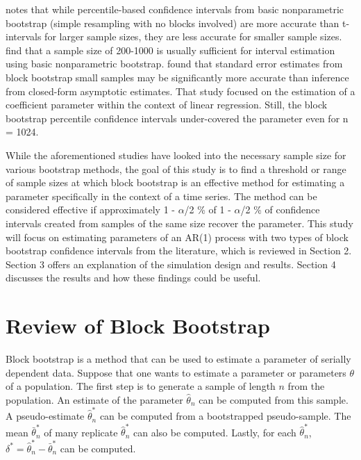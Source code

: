 \documentclass[12pt, letterpaper, titlepage]{article}
\begin{document}
\citet{hesterberg2015teachers} notes that while percentile-based confidence intervals from basic nonparametric bootstrap 
(simple resampling with no blocks involved) are more accurate than t-intervals for larger sample sizes, 
they are less accurate for smaller sample sizes. \citet{nevitt2001performance} find that a sample size of 
200-1000 is usually sufficient for interval estimation using basic nonparametric bootstrap.
\citet{goncalves2005bootstrap} found that standard error estimates from block bootstrap small 
samples may be significantly more accurate than inference from closed-form asymptotic estimates. 
That study focused on the estimation of a coefficient parameter within the context of linear regression. 
Still, the block bootstrap percentile confidence intervals under-covered the parameter even for n = 1024. 


While the aforementioned studies have looked into the necessary sample size for various bootstrap methods, 
the goal of this study is to find a threshold or range of sample sizes at which block bootstrap 
is an effective method for estimating a parameter specifically in the context of a time series. 
The method can be considered effective if approximately 1 - $\alpha$/2 \% of 1 - $\alpha$/2 \% of confidence intervals 
created from samples of the same size recover the parameter. This study will focus on estimating parameters of an 
AR(1) process with two types of block bootstrap confidence intervals from the literature, \citep{diciccio1996bootstrap}  \citep{rice2006mathematical} 
which is reviewed in Section 2. Section 3 offers an explanation of the simulation design and results. 
Section 4 discusses the results and how these findings could be useful.


\section{Review of Block Bootstrap}
\label{sec:blkbootreview}

Block bootstrap is a method that can be used to estimate a parameter of serially dependent data. Suppose that one wants to 
estimate a parameter or parameters $\theta$ of a population. The first step is to generate a sample of length $n$ from the population. 
An estimate of the parameter $\hat{\theta}_{n}$ can be computed from this sample. A pseudo-estimate $\hat\theta_n^*$ 
can be computed from a bootstrapped pseudo-sample. The mean $\bar\theta_n^*$ of many replicate $\hat\theta_n^*$ 
can also be computed. Lastly, for each $\hat\theta_n^*$, $\delta^* = \hat\theta_n^* - \bar\theta_n^*$ can be computed.
\end{document}
